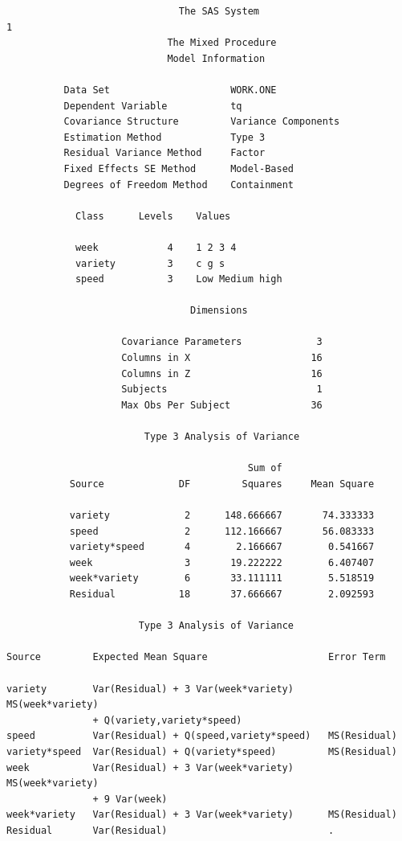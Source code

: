 \begin{small}
\begin{verbatim}
                              The SAS System                              1
                            The Mixed Procedure
                            Model Information

          Data Set                     WORK.ONE                 
          Dependent Variable           tq                       
          Covariance Structure         Variance Components      
          Estimation Method            Type 3                   
          Residual Variance Method     Factor                   
          Fixed Effects SE Method      Model-Based              
          Degrees of Freedom Method    Containment              

            Class      Levels    Values

            week            4    1 2 3 4                       
            variety         3    c g s                         
            speed           3    Low Medium high               

                                Dimensions

                    Covariance Parameters             3
                    Columns in X                     16
                    Columns in Z                     16
                    Subjects                          1
                    Max Obs Per Subject              36

                        Type 3 Analysis of Variance
 
                                          Sum of
           Source             DF         Squares     Mean Square

           variety             2      148.666667       74.333333
           speed               2      112.166667       56.083333
           variety*speed       4        2.166667        0.541667
           week                3       19.222222        6.407407
           week*variety        6       33.111111        5.518519
           Residual           18       37.666667        2.092593

                       Type 3 Analysis of Variance
 
Source         Expected Mean Square                     Error Term

variety        Var(Residual) + 3 Var(week*variety)      MS(week*variety)  
               + Q(variety,variety*speed)                                 
speed          Var(Residual) + Q(speed,variety*speed)   MS(Residual)      
variety*speed  Var(Residual) + Q(variety*speed)         MS(Residual)      
week           Var(Residual) + 3 Var(week*variety)      MS(week*variety)  
               + 9 Var(week)                                              
week*variety   Var(Residual) + 3 Var(week*variety)      MS(Residual)      
Residual       Var(Residual)                            .                 
\end{verbatim}
\newpage
\begin{verbatim}


\end{verbatim}
\end{small}
